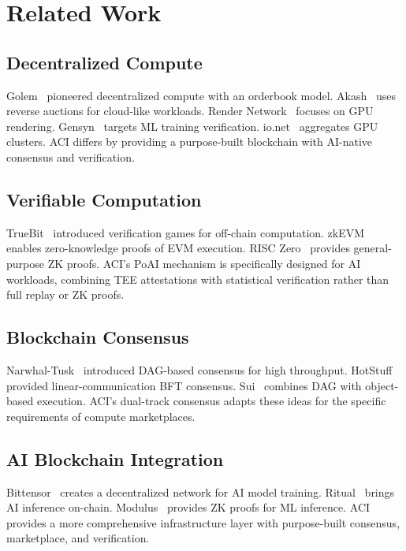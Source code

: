\section{Related Work}

\label{sec:related}

\subsection{Decentralized Compute}

Golem~\cite{golem2016} pioneered decentralized compute with an orderbook model. Akash~\cite{akash2020} uses reverse auctions for cloud-like workloads. Render Network~\cite{rendernetwork2021} focuses on GPU rendering. Gensyn~\cite{gensyn2023} targets ML training verification. io.net~\cite{ionet2024} aggregates GPU clusters. ACI differs by providing a purpose-built blockchain with AI-native consensus and verification.

\subsection{Verifiable Computation}

TrueBit~\cite{teutsch2019truebit} introduced verification games for off-chain computation. zkEVM~\cite{zkevm2023} enables zero-knowledge proofs of EVM execution. RISC Zero~\cite{risczero2023} provides general-purpose ZK proofs. ACI's PoAI mechanism is specifically designed for AI workloads, combining TEE attestations with statistical verification rather than full replay or ZK proofs.

\subsection{Blockchain Consensus}

Narwhal-Tusk~\cite{danezis2022narwhal} introduced DAG-based consensus for high throughput. HotStuff~\cite{yin2019hotstuff} provided linear-communication BFT consensus. Sui~\cite{sui2023} combines DAG with object-based execution. ACI's dual-track consensus adapts these ideas for the specific requirements of compute marketplaces.

\subsection{AI Blockchain Integration}

Bittensor~\cite{bittensor2023} creates a decentralized network for AI model training. Ritual~\cite{ritual2024} brings AI inference on-chain. Modulus~\cite{modulus2024} provides ZK proofs for ML inference. ACI provides a more comprehensive infrastructure layer with purpose-built consensus, marketplace, and verification.

